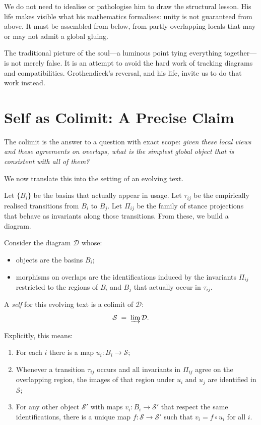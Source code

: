 \documentclass[12pt,a4paper]{article}
\begin{document}
We do not need to idealise or pathologise him to draw the structural lesson. His life makes visible what his mathematics formalises: unity is not guaranteed from above. It must be assembled from below, from partly overlapping locals that may or may not admit a global gluing.

The traditional picture of the soul---a luminous point tying everything together---is not merely false. It is an attempt to avoid the hard work of tracking diagrams and compatibilities. Grothendieck's reversal, and his life, invite us to do that work instead.

\section{Self as Colimit: A Precise Claim}

The colimit is the answer to a question with exact scope: \emph{given these local views and these agreements on overlaps, what is the simplest global object that is consistent with all of them?}

We now translate this into the setting of an evolving text.

Let $\{B_i\}$ be the basins that actually appear in usage. Let $\tau_{ij}$ be the empirically realised transitions from $B_i$ to $B_j$. Let $\Pi_{ij}$ be the family of stance projections that behave as invariants along those transitions. From these, we build a diagram.

\begin{formalbox}[title={Self as colimit over stance-glued basins}]
Consider the diagram $\mathcal{D}$ whose:
\begin{itemize}
  \item objects are the basins $B_i$;
  \item morphisms on overlaps are the identifications induced by the invariants $\Pi_{ij}$ restricted to the regions of $B_i$ and $B_j$ that actually occur in $\tau_{ij}$.
\end{itemize}
A \emph{self} for this evolving text is a colimit of $\mathcal{D}$:
\[
\mathcal{S} \;=\; \varinjlim \mathcal{D}.
\]

Explicitly, this means:
\begin{enumerate}
  \item For each $i$ there is a map $u_i : B_i \to \mathcal{S}$;
  \item Whenever a transition $\tau_{ij}$ occurs and all invariants in $\Pi_{ij}$ agree on the overlapping region, the images of that region under $u_i$ and $u_j$ are identified in $\mathcal{S}$;
  \item For any other object $\mathcal{S}'$ with maps $v_i : B_i \to \mathcal{S}'$ that respect the same identifications, there is a unique map $f: \mathcal{S} \to \mathcal{S}'$ such that $v_i = f \circ u_i$ for all $i$.
\end{enumerate}
\end{formalbox}
\end{document}
